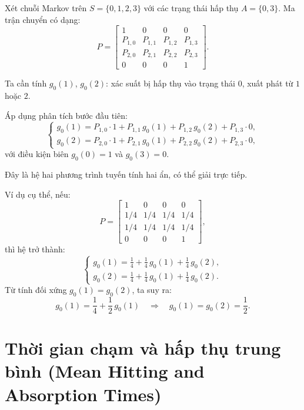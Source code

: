 \begin{example}
\label{ex:4state-hitting}
Xét chuỗi Markov trên $S = \{0, 1, 2, 3\}$ với các trạng thái hấp thụ $A = \{0, 3\}$.
Ma trận chuyển có dạng:
\[
  P = \begin{bmatrix}
    1 & 0 & 0 & 0 \\
    P_{1,0} & P_{1,1} & P_{1,2} & P_{1,3} \\
    P_{2,0} & P_{2,1} & P_{2,2} & P_{2,3} \\
    0 & 0 & 0 & 1
  \end{bmatrix}.
\]

Ta cần tính $g_0(1)$, $g_0(2)$: xác suất bị hấp thụ vào trạng thái $0$, xuất phát từ $1$ hoặc $2$.

Áp dụng phân tích bước đầu tiên:
\[
  \begin{cases}
    g_0(1) = P_{1,0} \cdot 1 + P_{1,1}\, g_0(1) + P_{1,2}\, g_0(2) + P_{1,3} \cdot 0,\\
    g_0(2) = P_{2,0} \cdot 1 + P_{2,1}\, g_0(1) + P_{2,2}\, g_0(2) + P_{2,3} \cdot 0,
  \end{cases}
\]
với điều kiện biên $g_0(0) = 1$ và $g_0(3) = 0$.

Đây là hệ hai phương trình tuyến tính hai ẩn, có thể giải trực tiếp.

Ví dụ cụ thể, nếu:
\[
  P = \begin{bmatrix}
    1 & 0 & 0 & 0 \\
    1/4 & 1/4 & 1/4 & 1/4 \\
    1/4 & 1/4 & 1/4 & 1/4 \\
    0 & 0 & 0 & 1
  \end{bmatrix},
\]
thì hệ trở thành:
\[
  \begin{cases}
    g_0(1) = \frac{1}{4} + \frac{1}{4}\, g_0(1) + \frac{1}{4}\, g_0(2),\\
    g_0(2) = \frac{1}{4} + \frac{1}{4}\, g_0(1) + \frac{1}{4}\, g_0(2).
  \end{cases}
\]
Từ tính đối xứng $g_0(1) = g_0(2)$, ta suy ra:
\[
  g_0(1) = \frac{1}{4} + \frac{1}{2}\, g_0(1)
  \quad\Longrightarrow\quad
  g_0(1) = g_0(2) = \frac{1}{2}.
\]
\end{example}

\section{Thời gian chạm và hấp thụ trung bình (Mean Hitting and Absorption Times)}
\label{sec:mean-hitting}

